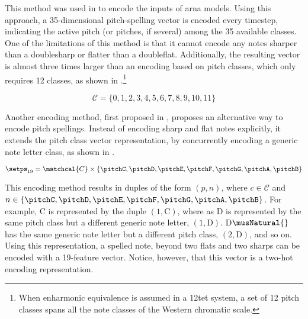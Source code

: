 This method was used in \textcite{micchi2020not,
micchi2021deep} to encode the inputs of \gls{arna} models.
Using this approach, a 35-dimensional pitch-spelling vector
is encoded every timestep, indicating the active pitch (or
pitches, if several) among the 35 available classes. One of
the limitations of this method is that it cannot encode any
notes sharper than a \gls{doublesharp} or flatter than a
\gls{doubleflat}. Additionally, the resulting vector is
almost three times larger than an encoding based on pitch
classes, which only requires 12 classes, as shown in
.\footnote{When enharmonic equivalence
is assumed in a \gls{12tet} system, a set of 12 pitch
classes spans all the note classes of the Western chromatic
scale.}

\begin{equation}
    \label{eq:pitch_classes}
    \mathcal{C} = \{0, 1, 2, 3, 4, 5, 6, 7, 8, 9, 10, 11\}
\end{equation}



Another encoding method, first proposed in
\textcite{napoleslopez2021augmentednet}, proposes an
alternative way to encode pitch spellings. Instead of
encoding \gls{sharp} and \gls{flat} notes explicitly, it
extends the pitch class vector representation, by
concurrently encoding a generic note letter class, as shown
in .

\begin{equation}
    \label{eq:pitch_spelling_19}
    \setps_{19} = \matchcal{C}
    \times \{ \pitchC, \pitchD, \pitchE, \pitchF, \pitchG, \pitchA, \pitchB \}
\end{equation}


This encoding method results in duples of the form $(p, n)$,
where $c \in \mathcal{C}$ and $n \in \{\pitchC, \pitchD,
\pitchE, \pitchF, \pitchG, \pitchA, \pitchB\}$. For example,
C\musSharp{} is represented by the duple $(1, \text{C})$,
where as D\musFlat{} is represented by the same pitch class
but a different generic note letter, $(1, \text{D})$.
D$\musNatural{}$ has the same generic note letter but a
different pitch class, $(2, \text{D})$, and so on. Using
this representation, a spelled note, beyond two flats and
two sharps can be encoded with a 19-feature vector. Notice,
however, that this vector is a two-hot encoding
representation.
